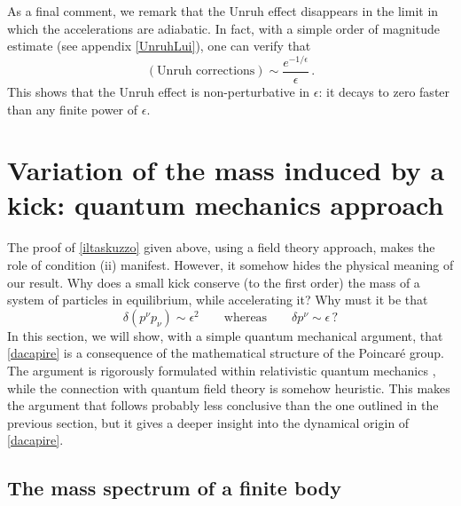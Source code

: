 \documentclass[twocolumn,usenatbib]{mnras2}
\begin{document}
As a final comment, we remark that the Unruh effect \citep{Unruh1976} disappears in the limit in which the accelerations are adiabatic. In fact, with a simple order of magnitude estimate (see appendix \ref{UnruhLui}), one can verify that 
\begin{equation}
    (\text{Unruh corrections}) \sim \dfrac{e^{-1/\epsilon}}{\epsilon} \, .
\end{equation}
This shows that the Unruh effect is non-perturbative in $\epsilon$: it decays to zero faster than any finite power of $\epsilon$.



\section{Variation of the mass induced by a kick: quantum mechanics approach}

The proof of \eqref{iltaskuzzo} given above, using a field theory approach, makes the role of condition (ii) manifest. However, it somehow hides the physical meaning of our result. Why does a small kick conserve (to the first order) the mass of a system of particles in equilibrium, while accelerating it? Why must it be that
\begin{equation}\label{dacapire}
    \delta (p^\nu p_\nu) \sim \epsilon^2  \quad \quad \text{whereas}  \quad \quad   \delta p^\nu \sim \epsilon \, ?
\end{equation}
In this section, we will show, with a simple quantum mechanical argument, that \eqref{dacapire} is a consequence of the mathematical structure of the Poincar\'e group. The argument is rigorously formulated within relativistic quantum mechanics \citep{Keister1991}, while the connection with quantum field theory is somehow heuristic. This makes the argument that follows probably less conclusive than the one outlined in the previous section, but it gives a deeper insight into the dynamical origin of \eqref{dacapire}.


\subsection{The mass spectrum of a finite body}\label{spectrumz}
\end{document}

